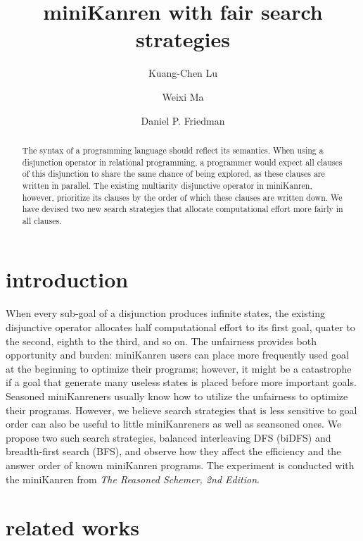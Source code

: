 \documentclass[format=acmlarge, review=true, authordraft=true]{acmart}
\title{miniKanren with fair search strategies}
\author{Kuang-Chen Lu}
\affiliation{Indiana University}
\author{Weixi Ma}
\affiliation{Indiana University}
\author{Daniel P. Friedman}
\affiliation{Indiana University}
\begin{document}
\begin{abstract}

The syntax of a programming language should reflect its semantics. When using a
disjunction operator in relational programming, a programmer would expect all
clauses of this disjunction to share the same chance of being explored, as
these clauses are written in parallel. The existing multiarity disjunctive
operator in miniKanren, however, prioritize its clauses by the order of which
these clauses are written down. We have devised two new search strategies that
allocate computational effort more fairly in all clauses.

\end{abstract}

\maketitle

\section{introduction}

When every sub-goal of a disjunction produces infinite states, the existing 
disjunctive operator allocates half computational effort to its first goal, 
quater to the second, eighth to the third, and so on. The unfairness provides 
both opportunity and burden: miniKanren users can place more frequently used 
goal at the beginning to optimize their programs; however, it might be a 
catastrophe if a goal that generate many useless states is placed before more 
important goals. Seasoned miniKanreners usually know how to utilize 
the unfairness to optimize their programs. However, we believe search strategies 
that is less sensitive to goal order can also be useful to little miniKanreners 
as well as seansoned ones. We propose two such search strategies, balanced 
interleaving DFS (biDFS) and breadth-first search (BFS), and observe how they 
affect the efficiency and the answer order of known miniKanren programs. The 
experiment is conducted with the miniKanren from \textit{The Reasoned Schemer, 
2nd Edition}.

\section{related works}

\end{document}
